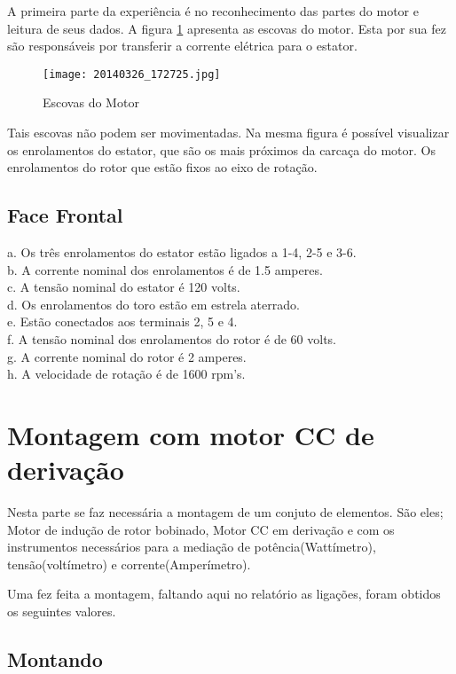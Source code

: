 \documentclass[paper=a4, fontsize=11pt]{article}
\begin{document}
A primeira parte da experiência é no reconhecimento das partes
do motor e leitura de seus dados. A figura \ref{fig:escovasmotor}
apresenta as escovas do motor. Esta por sua fez são responsáveis
por transferir a corrente elétrica para o estator.

\begin{figure}[!ht]
    \centering
    \texttt{[image: 20140326\_172725.jpg]}
    \caption{Escovas do Motor}
    \label{fig:escovasmotor}
\end{figure}

Tais escovas não podem ser movimentadas. Na mesma figura 
é possível visualizar os enrolamentos do estator, que são
os mais próximos da carcaça do motor. Os enrolamentos do
rotor que estão fixos ao eixo de rotação.

\subsection{Face Frontal}

a. Os três enrolamentos do estator estão ligados a 1-4, 2-5 e 3-6.\\
b. A corrente nominal dos enrolamentos é de 1.5 amperes.\\
c. A tensão nominal do estator é 120 volts.\\
d. Os enrolamentos do toro estão em estrela aterrado.\\
e. Estão conectados aos terminais 2, 5 e 4.\\
f. A tensão nominal dos enrolamentos do rotor é de 60 volts.\\
g. A corrente nominal do rotor é 2 amperes.\\
h. A velocidade de rotação é de 1600 rpm's.\\

\section{Montagem com motor CC de derivação}

Nesta parte se faz necessária a montagem de um 
conjuto de elementos. São eles; Motor de indução de rotor
bobinado, Motor CC em derivação e com os instrumentos
necessários para a mediação de potência(Wattímetro), 
tensão(voltímetro) e corrente(Amperímetro).

Uma fez feita a montagem, faltando aqui no relatório as 
ligações, foram obtidos os seguintes valores.


\subsection{Montando}
\end{document}
